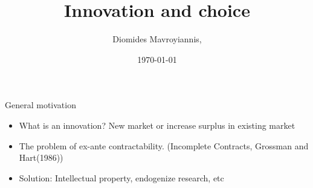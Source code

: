 \documentclass{beamer}
\title[Innovation and choice]{Innovation and choice} %
\author{ Diomides Mavroyiannis, } %
\institute[Dauphine] %
{
PSL/Paris Dauphine \\ %
\medskip%
}
\date{\today} %
\numberwithin{equation}{section}
\begin{document}
\begin{frame}
\titlepage %
\end{frame}



\begin{frame}{General motivation}
\begin{itemize}
    \item What is an innovation? New market or increase surplus in existing market
    \item The problem of ex-ante contractability. (Incomplete Contracts, Grossman and Hart(1986))
    \item Solution: Intellectual property, endogenize research, etc
\end{itemize}
\end{frame}
\end{document}
